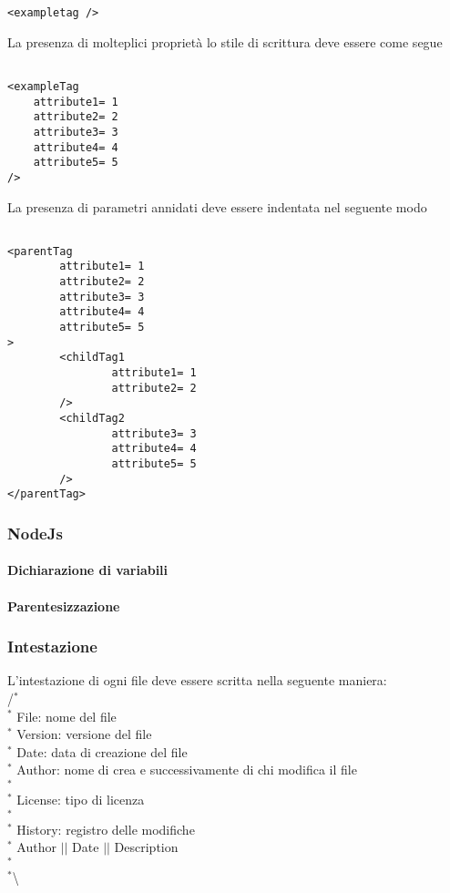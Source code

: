 \begin{lstlisting}
<exampletag />
\end{lstlisting}

La presenza di molteplici proprietà lo stile di scrittura deve essere come segue

\begin{lstlisting}

<exampleTag 
	attribute1= 1
	attribute2= 2
	attribute3= 3
	attribute4= 4
	attribute5= 5
/>
\end{lstlisting}

La presenza di parametri annidati deve essere indentata nel seguente modo 
\begin{center}
\begin{lstlisting}

<parentTag
		attribute1= 1
		attribute2= 2
		attribute3= 3
		attribute4= 4
		attribute5= 5
> 
		<childTag1
				attribute1= 1
				attribute2= 2
		/>	
		<childTag2
				attribute3= 3
				attribute4= 4
				attribute5= 5
		/>
</parentTag>
\end{lstlisting}

\end{center}



\subsubsection{NodeJs}

\paragraph{Dichiarazione di variabili}

\paragraph{Parentesizzazione}





\subsubsection{Intestazione}
L'intestazione di ogni file deve essere scritta nella seguente maniera: \\
/$^{*}$\\
$^{*}$ File: nome del file \\
$^{*}$ Version: versione del file \\
$^{*}$ Date: data di creazione del file \\
$^{*}$ Author: nome di crea e successivamente di chi modifica il file \\
$^{*}$ \\
$^{*}$ License: tipo di licenza \\
$^{*}$ \\
$^{*}$ History: registro delle modifiche \\
$^{*}$ Author $\vert$$\vert$ Date $\vert$$\vert$ Description \\
$^{*}$ \\
$^{*}$\textbackslash

